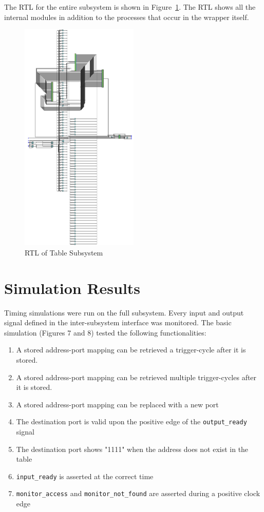 \documentclass{article}
\begin{document}
The RTL for the entire subsystem is shown in Figure~\ref{fig:table-rtl}. The RTL shows all the internal modules in addition to the processes that occur in the wrapper itself.

\begin{figure}[ht!]
  \centering
  	\includegraphics[width=0.5\textwidth]{table_rtl.PNG}
  \caption{RTL of Table Subsystem}
  \label{fig:table-rtl}
\end{figure}

\newpage
\section{Simulation Results}

Timing simulations were run on the full subsystem. Every input and output signal defined in the inter-subsystem interface was monitored. The basic simulation (Figures 7 and 8) tested the following functionalities:

\begin{enumerate}
\item A stored address-port mapping can be retrieved a trigger-cycle after it is stored.
\item A stored address-port mapping can be retrieved multiple trigger-cycles after it is stored.
\item A stored address-port mapping can be replaced with a new port
\item The destination port is valid upon the positive edge of the \texttt{output\_ready} signal
\item The destination port shows "1111" when the address does not exist in the table
\item \texttt{input\_ready} is asserted at the correct time
\item \texttt{monitor\_access} and \texttt{monitor\_not\_found} are asserted during a positive clock edge
\end{enumerate}
\end{document}
